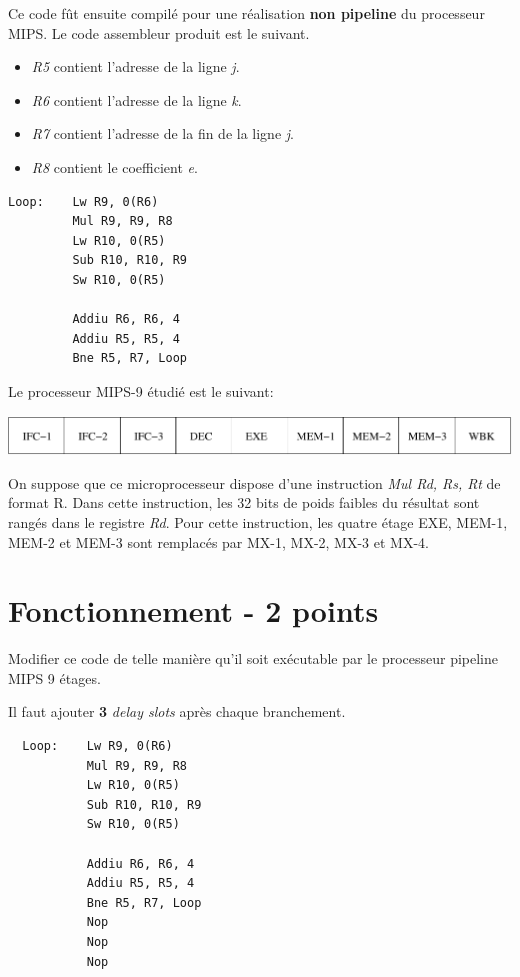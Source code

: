 Ce code f\^ut ensuite compil\'e pour une r\'ealisation \textbf{non pipeline}
du processeur MIPS. Le code assembleur produit est le suivant.

\begin{itemize}
  \item
    \textit{R5} contient l'adresse de la ligne \textit{j}.
  \item
    \textit{R6} contient l'adresse de la ligne \textit{k}.
  \item
    \textit{R7} contient l'adresse de la fin de la ligne \textit{j}.
  \item
    \textit{R8} contient le coefficient \textit{e}.
\end{itemize}

\begin{verbatim}
Loop:    Lw R9, 0(R6)
         Mul R9, R9, R8
         Lw R10, 0(R5)
         Sub R10, R10, R9
         Sw R10, 0(R5)

         Addiu R6, R6, 4
         Addiu R5, R5, 4
         Bne R5, R7, Loop
\end{verbatim}

Le processeur MIPS-9 \'etudi\'e est le suivant:

\begin{center}
  \includegraphics[scale=0.6]{figures/pipeline.pdf}
\end{center}

On suppose que ce microprocesseur dispose d'une instruction
\textit{Mul Rd, Rs, Rt} de format R. Dans cette instruction, les 32 bits
de poids faibles du r\'esultat sont rang\'es dans le registre \textit{Rd}.
Pour cette instruction, les quatre \'etage EXE, MEM-1, MEM-2 et MEM-3 sont
remplac\'es par MX-1, MX-2, MX-3 et MX-4.

%
%

\section{Fonctionnement - 2 points}

Modifier ce code de telle mani\`ere qu'il soit ex\'ecutable par le processeur
pipeline MIPS 9 \'etages.

\begin{correction}

  Il faut ajouter \textbf{3} \textit{delay slots} apr\`es chaque
  branchement.

  \begin{verbatim}
  Loop:    Lw R9, 0(R6)
           Mul R9, R9, R8
           Lw R10, 0(R5)
           Sub R10, R10, R9
           Sw R10, 0(R5)

           Addiu R6, R6, 4
           Addiu R5, R5, 4
           Bne R5, R7, Loop
           Nop
           Nop
           Nop
  \end{verbatim}

\end{correction}


